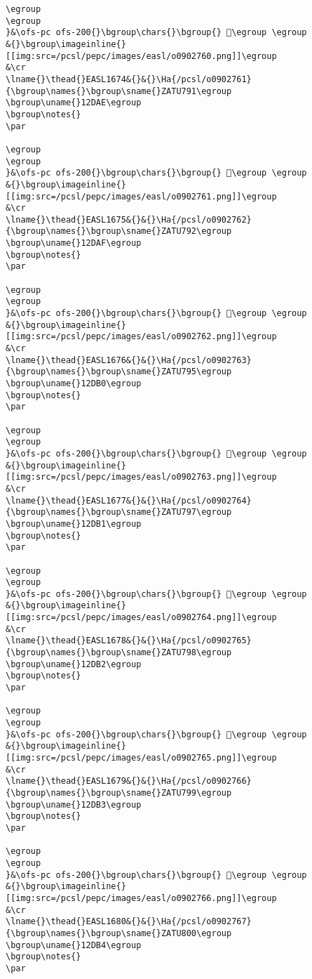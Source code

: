 \begin{verbatim}
\egroup
\egroup
}&\ofs-pc ofs-200{}\bgroup\chars{}\bgroup{} 𒶭\egroup \egroup
&{}\bgroup\imageinline{}[[img:src=/pcsl/pepc/images/easl/o0902760.png]]\egroup
&\cr
\lname{}\thead{}EASL1674&{}&{}\Ha{/pcsl/o0902761}{\bgroup\names{}\bgroup\sname{}ZATU791\egroup
\bgroup\uname{}12DAE\egroup
\bgroup\notes{}
\par 

\egroup
\egroup
}&\ofs-pc ofs-200{}\bgroup\chars{}\bgroup{} 𒶮\egroup \egroup
&{}\bgroup\imageinline{}[[img:src=/pcsl/pepc/images/easl/o0902761.png]]\egroup
&\cr
\lname{}\thead{}EASL1675&{}&{}\Ha{/pcsl/o0902762}{\bgroup\names{}\bgroup\sname{}ZATU792\egroup
\bgroup\uname{}12DAF\egroup
\bgroup\notes{}
\par 

\egroup
\egroup
}&\ofs-pc ofs-200{}\bgroup\chars{}\bgroup{} 𒶯\egroup \egroup
&{}\bgroup\imageinline{}[[img:src=/pcsl/pepc/images/easl/o0902762.png]]\egroup
&\cr
\lname{}\thead{}EASL1676&{}&{}\Ha{/pcsl/o0902763}{\bgroup\names{}\bgroup\sname{}ZATU795\egroup
\bgroup\uname{}12DB0\egroup
\bgroup\notes{}
\par 

\egroup
\egroup
}&\ofs-pc ofs-200{}\bgroup\chars{}\bgroup{} 𒶰\egroup \egroup
&{}\bgroup\imageinline{}[[img:src=/pcsl/pepc/images/easl/o0902763.png]]\egroup
&\cr
\lname{}\thead{}EASL1677&{}&{}\Ha{/pcsl/o0902764}{\bgroup\names{}\bgroup\sname{}ZATU797\egroup
\bgroup\uname{}12DB1\egroup
\bgroup\notes{}
\par 

\egroup
\egroup
}&\ofs-pc ofs-200{}\bgroup\chars{}\bgroup{} 𒶱\egroup \egroup
&{}\bgroup\imageinline{}[[img:src=/pcsl/pepc/images/easl/o0902764.png]]\egroup
&\cr
\lname{}\thead{}EASL1678&{}&{}\Ha{/pcsl/o0902765}{\bgroup\names{}\bgroup\sname{}ZATU798\egroup
\bgroup\uname{}12DB2\egroup
\bgroup\notes{}
\par 

\egroup
\egroup
}&\ofs-pc ofs-200{}\bgroup\chars{}\bgroup{} 𒶲\egroup \egroup
&{}\bgroup\imageinline{}[[img:src=/pcsl/pepc/images/easl/o0902765.png]]\egroup
&\cr
\lname{}\thead{}EASL1679&{}&{}\Ha{/pcsl/o0902766}{\bgroup\names{}\bgroup\sname{}ZATU799\egroup
\bgroup\uname{}12DB3\egroup
\bgroup\notes{}
\par 

\egroup
\egroup
}&\ofs-pc ofs-200{}\bgroup\chars{}\bgroup{} 𒶳\egroup \egroup
&{}\bgroup\imageinline{}[[img:src=/pcsl/pepc/images/easl/o0902766.png]]\egroup
&\cr
\lname{}\thead{}EASL1680&{}&{}\Ha{/pcsl/o0902767}{\bgroup\names{}\bgroup\sname{}ZATU800\egroup
\bgroup\uname{}12DB4\egroup
\bgroup\notes{}
\par 


\end{verbatim}
